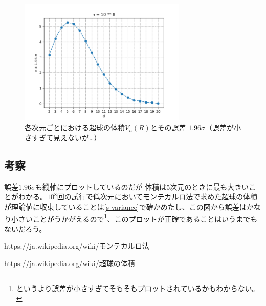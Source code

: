 \documentclass[a4paper,twoside]{jarticle}
\begin{document}
\begin{figure}[H]
\begin{center}
\includegraphics[width=8cm]{../python/report1_monte_carlo/out/v_s_plot.png}
\end{center}
\caption{各次元ごとにおける超球の体積$V_n(R)$とその誤差 $1.96 \sigma$（誤差が小さすぎて見えないが…）}
\end{figure}

\subsection{考察}
誤差$1.96 \sigma$も縦軸にプロットしているのだが
体積は5次元のときに最も大きいことがわかる。$10^8$回の試行で低次元においてモンテカルロ法で求めた超球の体積が理論値に収束していることは\ref{s-variance}で確かめたし、この図から誤差はかなり小さいことがうかがえるので\footnote{というより誤差が小さすぎてそもそもプロットされているかもわからない。}、このプロットが正確であることはいうまでもないだろう。

\begin{thebibliography}{99}
https://ja.wikipedia.org/wiki/モンテカルロ法

https://ja.wikipedia.org/wiki/超球の体積

\end{thebibliography}
\end{document}
